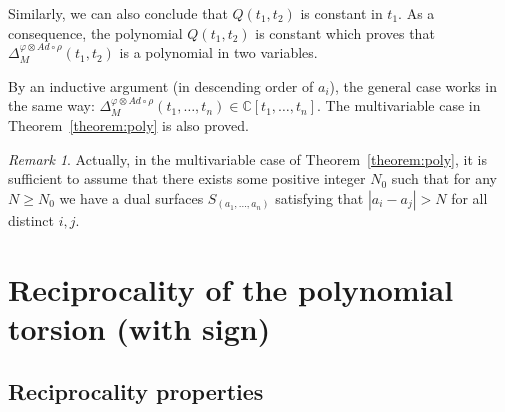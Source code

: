 \documentclass[a4paper]{amsart}
\theoremstyle{plain}
\theoremstyle{definition}
\theoremstyle{remark}
\newtheorem{remark}{Remark}%
\newcommand{\mygeq}{\geqslant}
\newcommand{\CC}{{\mathbb C}}
\newcommand{\sllrhot}{\mathfrak{sl}_2(\CC(t))_\rho}
\newcommand{\PolyTors}[2]{\Delta_{#1}^{#2}}
\newcommand{\otAd}[2]{#1 \otimes Ad \circ #2}
\begin{document}
Similarly, we can also
conclude that $Q(t_1, t_2)$ is constant in $t_1$.  As a consequence, the
polynomial $Q(t_1, t_2)$ is constant which proves that
$\PolyTors{M}{\otAd{\varphi}{\rho}}(t_1, t_2)$ is a polynomial in two
variables.

By an inductive argument (in descending order of $a_i$), the general
case works in the same way: $\PolyTors{M}{\otAd{\varphi}{\rho}}(t_1,
\ldots, t_n) \in \CC[t_1, \ldots, t_n]$. The multivariable case in
Theorem~\ref{theorem:poly} is also proved.



\begin{remark}
  Actually, in the multivariable case of Theorem~\ref{theorem:poly},
  it is sufficient to assume that there exists some positive integer
  $N_0$ such that for any $N \mygeq N_0$ we have a dual surfaces
  $S_{(a_1, \ldots, a_n)}$ satisfying that $|a_i -a_j| > N$ for all
  distinct $i, j$.
\end{remark}

\section{Reciprocality of the polynomial torsion (with sign)}
\label{section:symmetries}

\subsection{Reciprocality properties}
\end{document}
